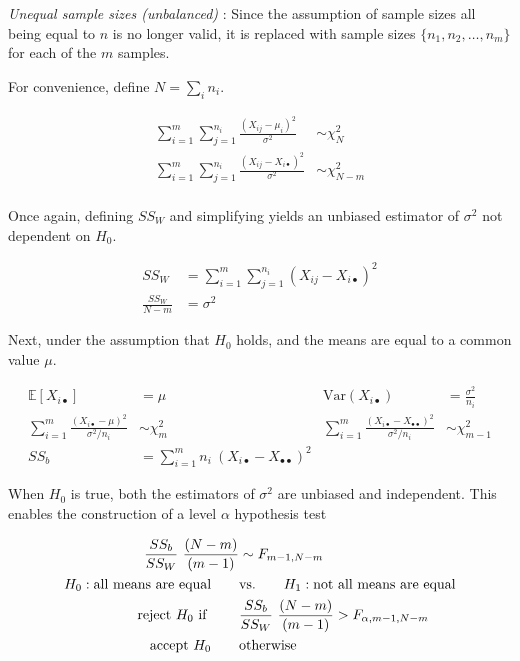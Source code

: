 \textit{Unequal sample sizes (unbalanced)} : Since the assumption of sample sizes all being equal to $ n $ is no longer valid, it is replaced with sample sizes $ \{n_1, n_2, \dots, n_m\} $ for each of the $ m $ samples.

For convenience, define $ N = \sum_i n_i $.

\begin{align}
	\sum\limits_{i = 1}^{m} \sum\limits_{j = 1}^{n_i} \frac{(X_{ij} - \mu_i)^2}{\sigma^2} &\sim \chi^2_{N} \\
	\sum\limits_{i = 1}^{m} \sum\limits_{j = 1}^{n_i} \frac{(X_{ij} - X_{i\bullet})^2}{\sigma^2} &\sim \chi^2_{N - m} \\
\end{align}

Once again, defining $ SS_W $ and simplifying yields an unbiased estimator of $ \sigma^2 $ not dependent on $ H_0 $.

\begin{align}
	SS_W &= \sum\limits_{i = 1}^{m} \sum\limits_{j = 1}^{n_i} (X_{ij} - X_{i\bullet})^2 \\
	\frac{SS_W}{N-m} &= \sigma^2
\end{align}

Next, under the assumption that $ H_0 $ holds, and the means are equal to a common value $ \mu $.

\begin{align}
	\mathbb{E}[X_{i\bullet}] &= \mu & \mathrm{Var}(X_{i\bullet}) &= \frac{\sigma^2}{n_i} \nonumber \\
	\sum\limits_{i = 1}^{m} \frac{(X_{i\bullet} - \mu)^2}{\sigma^2 / n_i} &\sim \chi^2_{m} & \sum\limits_{i = 1}^{m} \frac{(X_{i\bullet} - X_{\bullet\bullet})^2}{\sigma^2 / n_i} &\sim \chi^2_{m-1} \\
	SS_b &= \sum\limits_{i = 1}^{m} n_i\ (X_{i\bullet} - X_{\bullet\bullet})^2
\end{align}

When $ H_0 $ is true, both the estimators of $ \sigma^2 $ are unbiased and independent. This enables the construction of a level $ \alpha $ hypothesis test

\begin{align}
	\frac{SS_b}{SS_W}\ \frac{(N-m)}{(m-1)} &\sim F_{m-1, N-m} \nonumber \\
	H_0 : \text{all means are equal} \qquad &\text{vs.} \qquad H_1 : \text{not all means are equal} \nonumber \\
	\text{reject $ H_0 $ if } \qquad & \frac{SS_b}{SS_W}\ \frac{(N-m)}{(m-1)} > F_{\alpha, m-1, N-m}  \nonumber \\
	\text{accept $ H_0 $} \qquad & \text{otherwise}
\end{align}

